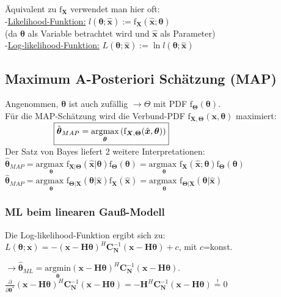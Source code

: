 \documentclass[a4paper,landscape,6pt]{article}
\newcommand{\ma}[1]{\ensuremath{\boldsymbol {#1}}}								%
\renewcommand{\vec}[1]{\ensuremath{\boldsymbol {#1}}}							%
\newcommand{\ul}[1]{\underline{#1}}
\begin{document}
\begin{multicols}{3}
Äquivalent zu $\text{f}_{\vec X}$ verwendet man hier oft:\\
-\ul{Likelihood-Funktion:} $l(\vec \theta;\hat{\vec x}) := \text{f}_{\vec X}(\hat{\vec x}; \vec \theta)$\\ (da $\vec \theta$ als Variable betrachtet wird und $\hat{\vec x}$ als Parameter)\\
-\ul{Log-likelihood-Funktion:} $L(\vec \theta;\hat{\vec x}) := \ln l(\vec \theta;\hat{\vec x})$
\subsection*{Maximum A-Posteriori Schätzung (MAP)}
Angenommen, $\vec \theta$ ist auch zufällig $\rightarrow \Theta$ mit PDF $\text{f}_{\vec \Theta}(\vec \theta)$.\\
Für die MAP-Schätzung wird die Verbund-PDF $\text{f}_{\vec X,\vec \Theta}(\vec x, \vec \theta)$ maximiert:\\
$\tab \tab \boxed{\hat{\vec \theta}_{MAP} = \underset{\vec \theta}{\text{argmax}} \left( \text{f}_{\vec X,\vec \Theta}(\hat{\vec x}, \vec \theta) \right)}$\\

Der Satz von Bayes liefert 2 weitere Interpretationen:\\

$\hat{\vec \theta}_{MAP} = \underset{\vec \theta}{\text{argmax }} \text{f}_{\vec X|\vec \Theta}(\hat{\vec x} | \vec \theta) \text{f}_{\vec \Theta}(\vec \theta) = \underset{\vec \theta}{\text{argmax }}\text{f}_{\vec X}(\hat{\vec x}; \vec \theta) \text{f}_{\vec \Theta}(\vec \theta) $\\

$\hat{\vec \theta}_{MAP} = \underset{\vec \theta}{\text{argmax }}  \text{f}_{\vec \Theta|\vec X}(\vec \theta|\hat{\vec x}) \text{f}_{\vec X}(\hat{\vec x}) = \underset{\vec \theta}{\text{argmax }} \text{f}_{\vec \Theta|\vec X}(\vec \theta|\hat{\vec x})$
\newpage

\subsubsection*{ML beim linearen Gauß-Modell}
Die Log-likelihood-Funktion ergibt sich zu:\\
$L(\vec \theta; \vec x) = -(\vec x - \ma H \vec \theta)^H \ma C_{\vec N}^{-1} (\vec x - \ma H \vec \theta) + c$, mit $c$=konst.

$\rightarrow \hat{\vec \theta}_{ML} = \underset{\vec \theta}{\text{argmin}} (\vec x - \ma H \vec \theta)^H \ma C_{\vec N}^{-1} (\vec x - \ma H \vec \theta)$.\\
$\frac{\partial}{\partial \vec \theta^*}(\vec x - \ma H \vec \theta)^H \ma C_{\vec N}^{-1} (\vec x - \ma H \vec \theta) = -\ma H^H\ma C_{\vec N}^{-1} (\vec x - \ma H \vec \theta)\overset{!}{=} 0$\\


\end{multicols}
\end{document}
